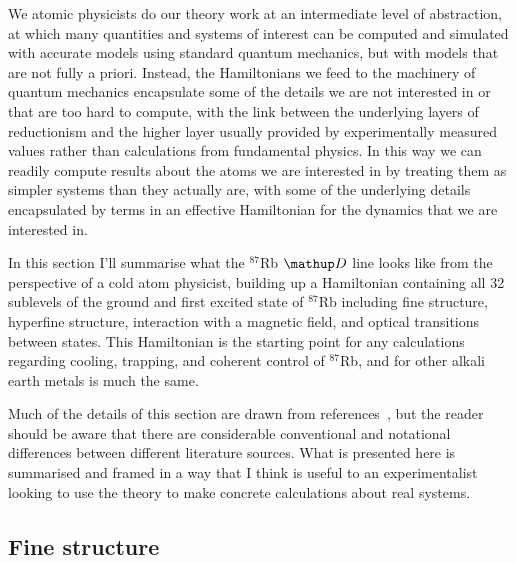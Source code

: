 We atomic physicists do our theory work at an intermediate level of abstraction, at which many quantities and systems of interest can be computed and simulated with accurate models using standard quantum mechanics, but with models that are not fully a priori. Instead, the Hamiltonians we feed to the machinery of quantum mechanics encapsulate some of the details we are not interested in or that are too hard to compute, with the link between the underlying layers of reductionism and the higher layer usually provided by experimentally measured values rather than calculations from fundamental physics. In this way we can readily compute results about the atoms we are interested in by treating them as simpler systems than they actually are, with some of the underlying details encapsulated by terms in an effective Hamiltonian for the dynamics that we are interested in.

In this section I'll summarise what the $^{87}$Rb $\up{D}$ line looks like from the perspective of a cold atom physicist, building up a Hamiltonian containing all 32 sublevels of the ground and first excited state of $^{87}$Rb including fine structure, hyperfine structure, interaction with a magnetic field, and optical transitions between states. This Hamiltonian is the starting point for any calculations regarding cooling, trapping, and coherent control of $^{87}$Rb, and for other alkali earth metals is much the same.

Much of the details of this section are drawn from references~\cite{steck_rubidium_2015, steck_quantum_2017, metcalf_laser_1999, king_angular_2008, farrell_consistency_1995}, but the reader should be aware that there are considerable conventional and notational differences between different literature sources. What is presented here is summarised and framed in a way that I think is useful to an experimentalist looking to use the theory to make concrete calculations about real systems.

\subsection{Fine structure}\label{sec:fine_structure}

